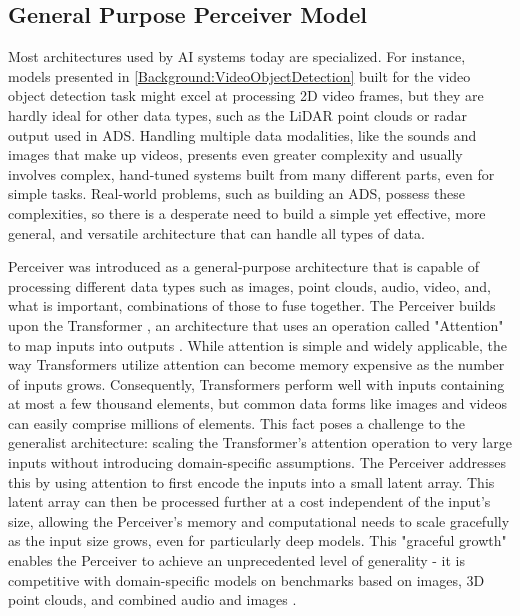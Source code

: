 \subsection{General Purpose Perceiver Model} \label{Background:Perceiver}

Most architectures used by AI systems today are specialized. For instance, models presented in \ref{Background:VideoObjectDetection} built for the video object detection task might excel at processing 2D video frames, but they are hardly ideal for other data types, such as the LiDAR point clouds or radar output used in ADS. Handling multiple data modalities, like the sounds and images that make up videos, presents even greater complexity and usually involves complex, hand-tuned systems built from many different parts, even for simple tasks. Real-world problems, such as building an ADS, possess these complexities, so there is a desperate need to build a simple yet effective, more general, and versatile architecture that can handle all types of data.

Perceiver \cite{jaeglePerceiverGeneralPerception2021} was introduced as a general-purpose architecture that is capable of processing different data types such as images, point clouds, audio, video, and, what is important, combinations of those to fuse together. The Perceiver builds upon the Transformer \cite{vaswaniAttentionAllYou2023}, an architecture that uses an operation called "Attention" to map inputs into outputs \cite{bahdanauNeuralMachineTranslation2016a}. While attention is simple and widely applicable, the way Transformers utilize attention can become memory expensive as the number of inputs grows. Consequently, Transformers perform well with inputs containing at most a few thousand elements, but common data forms like images and videos can easily comprise millions of elements. This fact poses a challenge to the generalist architecture: scaling the Transformer's attention operation to very large inputs without introducing domain-specific assumptions. The Perceiver addresses this by using attention to first encode the inputs into a small latent array. This latent array can then be processed further at a cost independent of the input's size, allowing the Perceiver's memory and computational needs to scale gracefully as the input size grows, even for particularly deep models. This "graceful growth" enables the Perceiver to achieve an unprecedented level of generality - it is competitive with domain-specific models on benchmarks based on images, 3D point clouds, and combined audio and images \cite{jaeglePerceiverGeneralPerception2021}.

